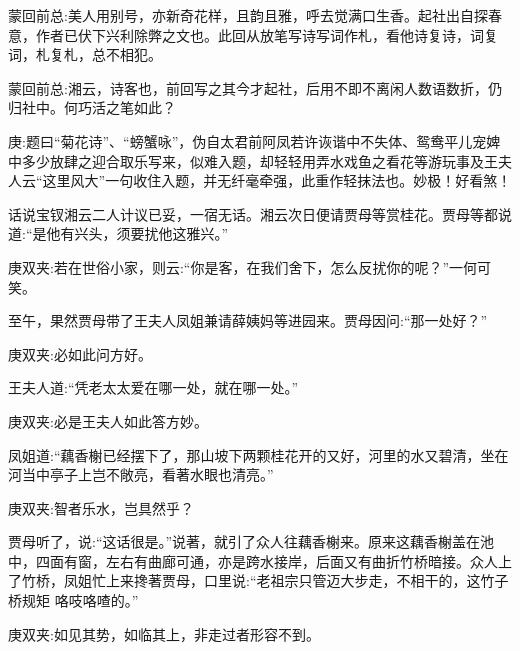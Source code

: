 
\begin{parag}
    \begin{note}蒙回前总:美人用别号，亦新奇花样，且韵且雅，呼去觉满口生香。起社出自探春意，作者已伏下兴利除弊之文也。此回从放笔写诗写词作札，看他诗复诗，词复词，札复札，总不相犯。\end{note}
\end{parag}


\begin{parag}
    \begin{note}蒙回前总:湘云，诗客也，前回写之其今才起社，后用不即不离闲人数语数折，仍归社中。何巧活之笔如此？\end{note}
\end{parag}


\begin{parag}
    \begin{note}庚:题曰“菊花诗”、“螃蟹咏”，伪自太君前阿凤若许诙谐中不失体、鸳鸯平儿宠婢中多少放肆之迎合取乐写来，似难入题，却轻轻用弄水戏鱼之看花等游玩事及王夫人云“这里风大”一句收住入题，并无纤毫牵强，此重作轻抹法也。妙极！好看煞！\end{note}
\end{parag}


\begin{parag}
    话说宝钗湘云二人计议已妥，一宿无话。湘云次日便请贾母等赏桂花。贾母等都说道:“是他有兴头，须要扰他这雅兴。”\begin{note}庚双夹:若在世俗小家，则云:“你是客，在我们舍下，怎么反扰你的呢？”一何可笑。\end{note}至午，果然贾母带了王夫人凤姐兼请薛姨妈等进园来。贾母因问:“那一处好？”\begin{note}庚双夹:必如此问方好。\end{note}王夫人道:“凭老太太爱在哪一处，就在哪一处。”\begin{note}庚双夹:必是王夫人如此答方妙。\end{note}凤姐道:“藕香榭已经摆下了，那山坡下两颗桂花开的又好，河里的水又碧清，坐在河当中亭子上岂不敞亮，看著水眼也清亮。”\begin{note}庚双夹:智者乐水，岂具然乎？\end{note}贾母听了，说:“这话很是。”说著，就引了众人往藕香榭来。原来这藕香榭盖在池中，四面有窗，左右有曲廊可通，亦是跨水接岸，后面又有曲折竹桥暗接。众人上了竹桥，凤姐忙上来搀著贾母，口里说:“老祖宗只管迈大步走，不相干的，这竹子桥规矩 咯吱咯喳的。”\begin{note}庚双夹:如见其势，如临其上，非走过者形容不到。\end{note}
\end{parag}


